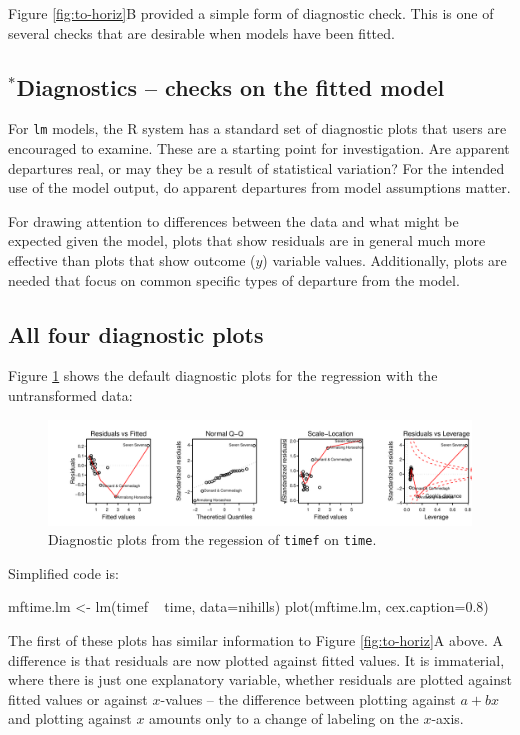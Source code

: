\documentclass{tufte-book}\usepackage[]{graphicx}\usepackage[]{color}
\newcommand{\txtt}[1]{\texttt{#1}}
\begin{document}
Figure \ref{fig:to-horiz}B provided a simple form of diagnostic check.
This is one of several checks that are desirable when models
have been fitted.

\subsection{$^*$Diagnostics -- checks on the fitted model}\label{ss:diag}

For \texttt{lm} models, the R system has a standard set of diagnostic
plots that users are encouraged to examine.  These are a starting
point for investigation. Are apparent departures real, or may they be a
result of statistical variation?  For the intended use of the model
output, do apparent departures from model assumptions matter.

For drawing attention to differences between the data and what might
be expected given the model, plots that show residuals are in general
much more effective than plots that show outcome ($y$) variable
values. Additionally, plots are needed that focus on common specific
types of departure from the model.

\subsection*{All four diagnostic plots}
Figure \ref{fig:diag-mftime} shows the default
diagnostic plots for the regression with the untransformed data:

\begin{figure}
\begin{Schunk}


\centerline{\includegraphics[width=\textwidth]{figs/8-diag-mf-1} }

\end{Schunk}
\caption{Diagnostic plots from the regession of \txtt{timef} on
  \txtt{time}.}\label{fig:diag-mftime}
\end{figure}
\noindent
Simplified code is:
\begin{Schunk}
\begin{Sinput}
mftime.lm <- lm(timef ~ time, data=nihills)
plot(mftime.lm, cex.caption=0.8)
\end{Sinput}
\end{Schunk}
The first of these plots has similar information to Figure \ref{fig:to-horiz}A
above.  A difference is that residuals are now plotted against fitted
values.  It is immaterial, where there is just one explanatory variable,
whether residuals are plotted against fitted values or against
$x$-values -- the difference between plotting against $a + b x$ and
plotting against $x$ amounts only to a change of labeling on the
$x$-axis.
\end{document}
